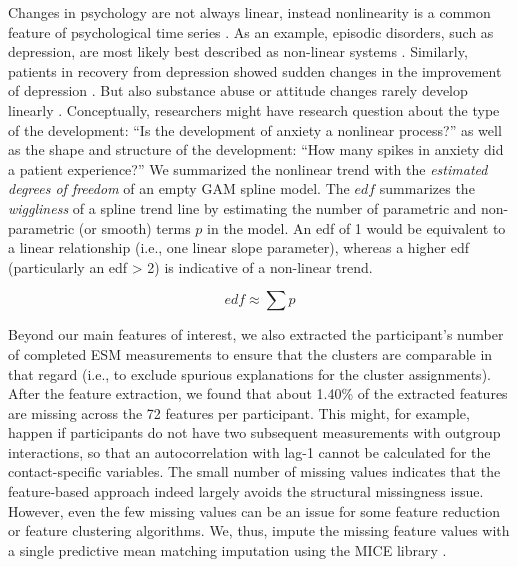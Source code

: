 Changes in psychology are not always linear, instead nonlinearity is a
common feature of psychological time series \citep{hayes2007}. As an
example, episodic disorders, such as depression, are most likely best
described as non-linear systems \citep{hosenfeld2015}. Similarly,
patients in recovery from depression showed sudden changes in the
improvement of depression \citep{helmich2020a}. But also substance abuse
\citep{boker1998} or attitude changes rarely develop linearly
\citep{vandermaas2003}. Conceptually, researchers might have research
question about the type of the development: ``Is the development of
anxiety a nonlinear process?'' as well as the shape and structure of the
development: ``How many spikes in anxiety did a patient experience?'' We
summarized the nonlinear trend with the
\textit{estimated degrees of freedom} of an empty GAM spline model. The
\(edf\) summarizes the \textit{wiggliness} of a spline trend line by
estimating the number of parametric and non-parametric (or smooth) terms
\(p\) in the model. An edf of 1 would be equivalent to a linear
relationship (i.e., one linear slope parameter), whereas a higher edf
(particularly an edf \textgreater{} 2) is indicative of a non-linear
trend.

\begin{equation} \label{eq:edf}
  edf \approx \sum p
\end{equation}

Beyond our main features of interest, we also extracted the
participant's number of completed ESM measurements to ensure that the
clusters are comparable in that regard (i.e., to exclude spurious
explanations for the cluster assignments). After the feature extraction,
we found that about 1.40\% of the extracted features are missing across
the 72 features per participant. This might, for example, happen if
participants do not have two subsequent measurements with outgroup
interactions, so that an autocorrelation with lag-1 cannot be calculated
for the contact-specific variables. The small number of missing values
indicates that the feature-based approach indeed largely avoids the
structural missingness issue. However, even the few missing values can
be an issue for some feature reduction or feature clustering algorithms.
We, thus, impute the missing feature values with a single predictive
mean matching imputation using the MICE library \citep[][]{buuren2011}.

